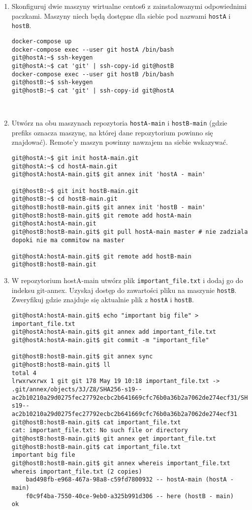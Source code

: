 \documentclass[polish]{article}
\begin{document}
\begin{enumerate}
    \item Skonfiguruj dwie maszyny wirtualne centos6 z zainstalowanymi odpowiednimi
        paczkami.
        Maszyny niech będą dostępne dla siebie pod nazwami \texttt{hostA} i \texttt{hostB}.
        \begin{lstlisting}
docker-compose up
docker-compose exec --user git hostA /bin/bash
git@hostA:~$ ssh-keygen
git@hostA:~$ cat 'git' | ssh-copy-id git@hostB
docker-compose exec --user git hostB /bin/bash
git@hostB:~$ ssh-keygen
git@hostB:~$ cat 'git' | ssh-copy-id git@hostA
        \end{lstlisting}

\   \item Utwórz na obu maszynach repozytoria \texttt{hostA-main} i \texttt{hostB-main} (gdzie
        prefiks oznacza maszynę, na której dane repozytorium powinno się znajdować).
        Remote'y maszyn powinny nawzajem na siebie wskazywać.

        \begin{lstlisting}
git@hostA:~$ git init hostA-main.git
git@hostA:~$ cd hostA-main.git
git@hostA:hostA-main.git$ git annex init 'hostA - main'

git@hostB:~$ git init hostB-main.git
git@hostB:~$ cd hostB-main.git
git@hostB:hostB-main.git$ git annex init 'hostB - main'
git@hostB:hostB-main.git$ git remote add hostA-main git@hostA:hostA-main.git
git@hostB:hostB-main.git$ git pull hostA-main master # nie zadziala dopoki nie ma commitow na master

git@hostA:hostA-main.git$ git remote add hostB-main git@hostB:hostB-main.git
        \end{lstlisting}

    \item W repozytorium hostA-main utwórz plik \texttt{important\_file.txt} i dodaj go do
   indeksu git-annex.
   Uzyskaj dostęp do zawartości pliku na maszynie \texttt{hostB}.
   Zweryfikuj gdzie znajduje się aktualnie plik z \texttt{hostA} i \texttt{hostB}.

   \begin{lstlisting}
git@hostA:hostA-main.git$ echo "important big file" > important_file.txt
git@hostA:hostA-main.git$ git annex add important_file.txt
git@hostA:hostA-main.git$ git commit -m "important_file"

git@hostB:hostB-main.git$ git annex sync
git@hostB:hostB-main.git$ ll
total 4
lrwxrwxrwx 1 git git 178 May 19 10:18 important_file.txt -> .git/annex/objects/3J/Z8/SHA256-s19--ac2b10210a29d0275fec27792ecbc2b641669cfc76b0a36b2a7062de274ecf31/SHA256-s19--ac2b10210a29d0275fec27792ecbc2b641669cfc76b0a36b2a7062de274ecf31
git@hostB:hostB-main.git$ cat important_file.txt
cat: important_file.txt: No such file or directory
git@hostB:hostB-main.git$ git annex get important_file.txt
git@hostB:hostB-main.git$ cat important_file.txt
important big file
git@hostB:hostB-main.git$ git annex whereis important_file.txt
whereis important_file.txt (2 copies)
    bad498fb-e968-467a-98a8-c59fd7800932 -- hostA-main (hostA - main)
    f0c9f4ba-7550-40ce-9eb0-a325b991d306 -- here (hostB - main)
ok


\end{lstlisting}
\end{enumerate}
\end{document}

